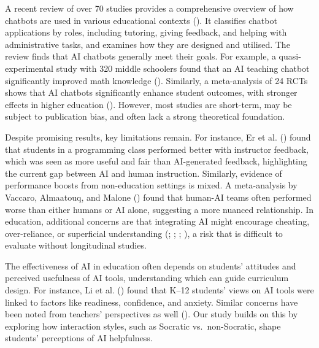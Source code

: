 \documentclass[
  12pt,
]{article}
\begin{document}
A recent review of over 70 studies provides a comprehensive overview of how chatbots are used in various educational contexts (). It classifies chatbot applications by roles, including tutoring, giving feedback, and helping with administrative tasks, and examines how they are designed and utilised. The review finds that AI chatbots generally meet their goals. For example, a quasi-experimental study with 320 middle schoolers found that an AI teaching chatbot significantly improved math knowledge (). Similarly, a meta-analysis of 24 RCTs shows that AI chatbots significantly enhance student outcomes, with stronger effects in higher education (). However, most studies are short-term, may be subject to publication bias, and often lack a strong theoretical foundation.

Despite promising results, key limitations remain. For instance, Er et al. () found that students in a programming class performed better with instructor feedback, which was seen as more useful and fair than AI-generated feedback, highlighting the current gap between AI and human instruction. Similarly, evidence of performance boosts from non-education settings is mixed. A meta-analysis by Vaccaro, Almaatouq, and Malone () found that human-AI teams often performed worse than either humans or AI alone, suggesting a more nuanced relationship. In education, additional concerns are that integrating AI might encourage cheating, over-reliance, or superficial understanding (; ; ; ), a risk that is difficult to evaluate without longitudinal studies.

The effectiveness of AI in education often depends on students' attitudes and perceived usefulness of AI tools, understanding which can guide curriculum design. For instance, Li et al. () found that K--12 students' views on AI tools were linked to factors like readiness, confidence, and anxiety. Similar concerns have been noted from teachers' perspectives as well (). Our study builds on this by exploring how interaction styles, such as Socratic vs.~non-Socratic, shape students' perceptions of AI helpfulness.
\end{document}
